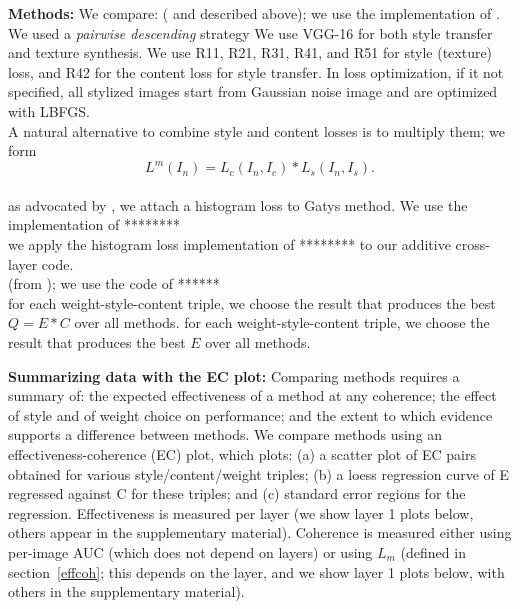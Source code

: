 \documentclass[runningheads]{llncs}
\begin{document}
{\bf Methods:}  We compare:
 (\cite{gatys2016image} and described above); we use the implementation of .\\
 We used a {\em pairwise descending}    strategy
We use VGG-16 for both style transfer and texture synthesis.  We use R11, R21, R31, R41, and R51 for style (texture) 
loss, and R42 for the content loss for style transfer. In loss optimization, if it not specified, all stylized images
start from Gaussian noise image and are optimized with LBFGS. \\
  A natural alternative to combine style and content losses is to
multiply them; we form 
\[
L^m(I_n) = L_c(I_n, I_c) *  L_s(I_n, I_s).
\]
\\
  as advocated by \cite{risser2017stable}, we attach a histogram loss to
Gatys method.  We use the implementation of ********\\
 we apply the histogram loss implementation of ******** to our additive cross-layer
code.\\
(from \cite{UST});  we use the code of ******\\
  for each weight-style-content triple, we choose the result that produces the best  $Q=E*C$
over all methods.
 for each weight-style-content triple, we choose the result that produces the best  $E$
over all methods.


{\bf Summarizing data with the EC plot:} Comparing methods requires a summary of: the expected effectiveness of a method at any coherence; 
the effect of style and of weight choice on performance; and the extent to which evidence supports a difference between
methods.   We compare methods using an effectiveness-coherence (EC) plot, which plots: (a) a scatter plot of EC pairs obtained for various
style/content/weight triples;   (b) a loess regression curve of E regressed against C for these triples; and (c)
standard error regions for the regression.     Effectiveness is measured per layer (we show layer 1 plots below, others
appear in the supplementary material).  Coherence is measured either using per-image AUC (which does not depend on
layers) or using $L_m$ (defined in section~\ref{effcoh}; this depends on the layer, and we show layer 1 plots below,
with others in the supplementary material).
\end{document}
